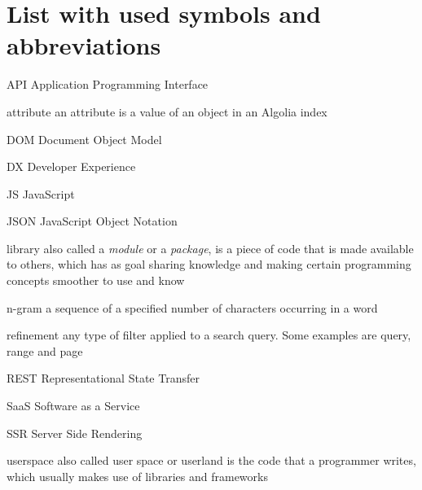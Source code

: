 
\chapter{List with used symbols and abbreviations}

\begin{abbreviations}
\item[API] Application Programming Interface
\item[attribute] an attribute is a value of an object in an Algolia index
\item[DOM] Document Object Model
\item[DX] Developer Experience
\item[JS] JavaScript
\item[JSON] JavaScript Object Notation
\item[library] also called a \emph{module} or a \emph{package}, is a piece of code that is made available to others, which has as goal sharing knowledge and making certain programming concepts smoother to use and know
\item[n-gram] a sequence of a specified number of characters occurring in a word\cite{kimbrell1988searching}
\item[refinement] any type of filter applied to a search query. Some examples are query, range and page
\item[REST] Representational State Transfer\cite{fielding2000architectural}
\item[SaaS] Software as a Service
\item[SSR] Server Side Rendering
\item[userspace] also called user space or userland is the code that a programmer writes, which usually makes use of libraries and frameworks
\end{abbreviations}
